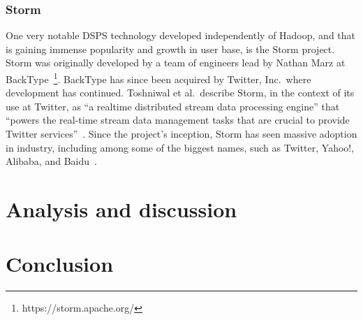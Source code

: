 \documentclass[a4paper,11pt]{article}
\begin{document}


\subsubsection{Storm} %
\label{ssub:storm}

One very notable DSPS technology developed independently of Hadoop, and that is gaining immense popularity and growth in
user base, is the Storm project. Storm was originally developed by a team of engineers lead by Nathan Marz at
BackType~\footnote{https://storm.apache.org/}. BackType has since been acquired by Twitter, Inc.\ where development has
continued. Toshniwal et al.\ describe Storm, in the context of its use at Twitter, as ``a realtime distributed stream
data processing engine'' that ``powers the real-time stream data management tasks that are crucial to provide Twitter
services''~\cite{toshniwal2014storm}. Since the project's inception, Storm has seen massive adoption in industry,
including among some of the biggest names, such as Twitter, Yahoo!, Alibaba, and Baidu~\cite{storm_users}.





\section{Analysis and discussion} %
\label{sec:analysis_and_discussion}



\section{Conclusion} %
\label{sec:conclusion}


\newpage




\newpage
\end{document}
